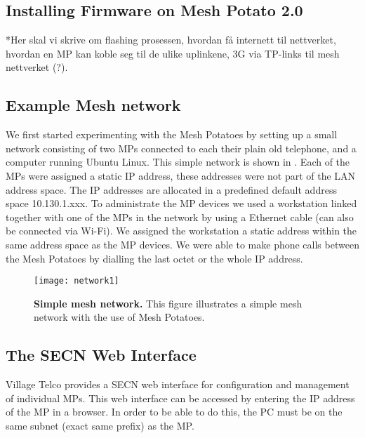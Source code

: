 \subsection{Installing Firmware on Mesh Potato 2.0}
*Her skal vi skrive om flashing prosessen, hvordan få internett til nettverket, hvordan  en MP kan koble seg til de ulike uplinkene, 3G via TP-links til mesh nettverket (?). 

\subsection{Example Mesh network}
We first started experimenting with the Mesh Potatoes by setting up a small network consisting of two MPs connected to each their plain old telephone, and a computer running Ubuntu Linux. This simple network is shown in . Each of the MPs were assigned a static IP address, these addresses were not part of the LAN address space. The IP addresses are allocated in a predefined default address space 10.130.1.xxx. To administrate the MP devices we used a workstation linked together with one of the MPs in the network by using a Ethernet cable (can also be connected via Wi-Fi). We assigned the workstation a static address within the same address space as the MP devices. We were able to make phone calls between the Mesh Potatoes by dialling the last octet or the whole IP address.

\begin{figure}[b]
  \centering
      \texttt{[image: network1]}
  \caption [Example of a simple mesh network]{\textbf{Simple mesh network.} This figure illustrates a simple mesh network with the use of Mesh Potatoes.}
  \label{fig:network}
\end{figure}

\subsection{The SECN Web Interface}
Village Telco provides a SECN web interface for configuration and management of individual MPs. This web interface can be accessed by entering the IP address of the MP in a browser. In order to be able to do this, the PC must be on the same subnet (exact same prefix) as the MP.  









